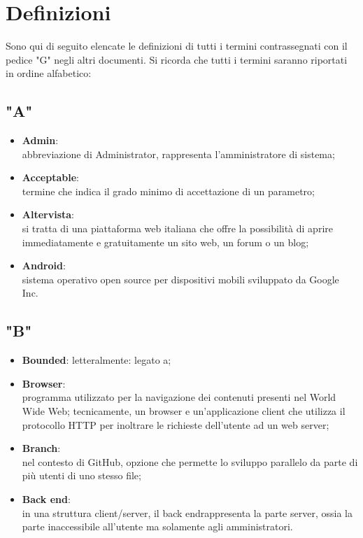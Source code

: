 \section{Definizioni}
Sono qui di seguito elencate le definizioni di tutti i termini contrassegnati con il pedice "G" negli altri documenti.
Si ricorda che tutti i termini saranno riportati in ordine alfabetico:

\subsection*{"A"}
\begin{itemize}
\itemsep2em
\item \textbf{Admin}:\\ abbreviazione di Administrator, rappresenta l'amministratore di sistema;
\item \textbf{Acceptable}:\\ termine che indica il grado minimo di accettazione di un parametro;
\item \textbf{Altervista}:\\ si tratta di una piattaforma web italiana che offre la possibilità di aprire immediatamente e gratuitamente un sito web, un forum o un blog;
\item \textbf{Android}:\\ sistema operativo open source per dispositivi mobili sviluppato da Google Inc.
\end{itemize}
\subsection*{"B"}
\begin{itemize}
\itemsep2em
\item \textbf{Bounded}: letteralmente: legato a;
\item \textbf{Browser}:\\ programma utilizzato per la navigazione dei contenuti presenti nel World Wide Web;
tecnicamente, un browser e un’applicazione client che utilizza il protocollo HTTP per inoltrare le richieste dell’utente ad un web server;
\item \textbf{Branch}:\\ nel contesto di GitHub, opzione che permette lo sviluppo parallelo da parte di più utenti di uno stesso file;
\item \textbf{Back end}:\\ in una struttura client/server, il back endrappresenta la parte server, ossia la parte inaccessibile all'utente ma solamente agli amministratori.
\end{itemize}
